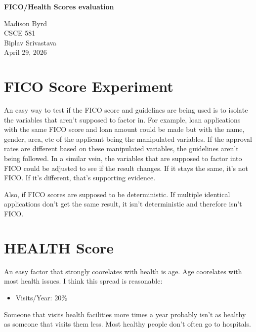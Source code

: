 \documentclass[12pt]{article}
\begin{document}
\begin{titlepage}
\centering
\vspace*{2in}

{\Large \textbf{FICO/Health Scores evaluation}}

\vspace{1.5in}

Madison Byrd \\
CSCE 581 \\
Biplav Srivastava \\
April 29, 2026 \\ 

\vfill
\end{titlepage}

\section{FICO Score Experiment}

An easy way to test if the FICO score and guidelines are being used is to isolate the variables that aren't supposed to 
factor in. For example, loan applications with the same FICO score and loan amount could be made but with the 
name, gender, area, etc of the applicant being the manipulated variables. If the approval rates are different based
on these manipulated variables, the guidelines aren't being followed. In a similar vein, the variables that are supposed to 
factor into FICO could be adjusted to see if the result changes. If it stays the same, it's not FICO. If it's different, that's
supporting evidence.

Also, if FICO scores are supposed to be deterministic. If multiple identical applications don't get the same result, it
isn't deterministic and therefore isn't FICO.

\section{HEALTH Score}

An easy factor that strongly coorelates with health is age. Age coorelates with most health issues. I think this spread is reasonable:
\begin{itemize}
    \item{Visits/Year: 20\%}
\end{itemize}

Someone that visits health facilities more times a year probably isn't as healthy as someone that visits them less. 
Most healthy people don't often go to hospitals.
\end{document}
